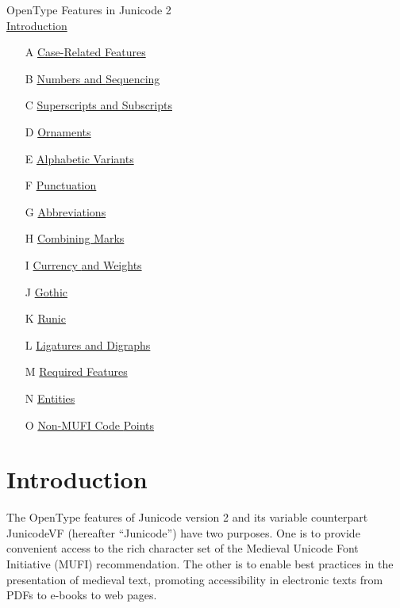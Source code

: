 \documentclass[letterpaper,12pt]{article}
\title{}
\author{}
\date{2021-10-08}
\newcounter{Feature}
\begin{document}
{\mdseries\color[rgb]{0.47058824,0.011764706,0.4509804}
\Large OpenType Features in Junicode 2}\\[1ex]

\hyperlink{intro}{Introduction}

\begin{itemize}
\item[A] \hyperlink{SectionA}{Case-}\hyperlink{SectionA}{R}\hyperlink{SectionA}{elated
}\hyperlink{SectionA}{F}\hyperlink{SectionA}{eatures}

\item[B] \hyperlink{SectionB}{Numbers and }\hyperlink{SectionB}{S}\hyperlink{SectionB}{equencing}

\item[C] \hyperlink{SectionC}{Superscripts and Subscripts}

\item[D] \hyperlink{SectionD}{Ornaments}

\item[E] \hyperlink{SectionE}{Alphabetic Variants}

\item[F] \hyperlink{SectionF}{Punctuation}

\item[G] \hyperlink{SectionG}{Abbreviations}

\item[H] \hyperlink{SectionH}{Combining Marks}

\item[I] \hyperlink{SectionI}{Currency }\hyperlink{SectionI}{and Weights}

\item[J] \hyperlink{SectionJ}{Gothic}

\item[K] \hyperlink{SectionK}{Runic}

\item[L] \hyperlink{SectionL}{Ligatures and Digraphs}

\item[M] \hyperlink{req}{Required Features}

\item[N] \hyperlink{SectionN}{Entities}

\item[O] \hyperlink{nonmufi}{Non-MUFI Code }\hyperlink{nonmufi}{Points}
\end{itemize}

\section{Introduction}
\hypertarget{intro}{}The OpenType features of Junicode version 2 and its variable counterpart JunicodeVF (hereafter
``Junicode'') have two purposes. One is to provide convenient access to the rich character set of the Medieval Unicode
Font Initiative (MUFI) recommendation. The other is to enable best practices in the presentation of medieval text,
promoting accessibility in electronic texts from PDFs to e-books to web pages.
\end{document}
